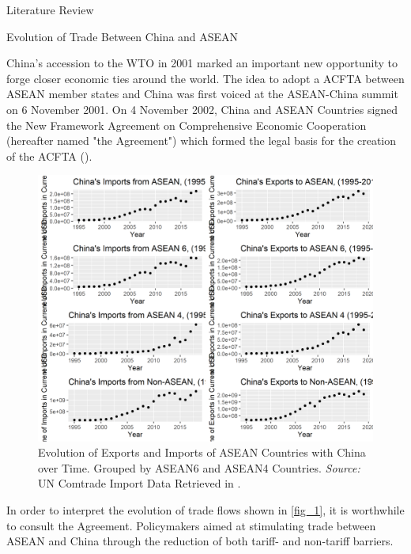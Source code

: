 \begin{section}{Literature Review}

\begin{subsection}{Evolution of Trade Between China and ASEAN}

China’s accession to the WTO in 2001 marked an important new opportunity to forge closer economic ties around the world. The idea to adopt a ACFTA between ASEAN member states and China was first voiced at the ASEAN-China summit on 6 November 2001. On 4 November 2002, China and ASEAN Countries signed the New Framework Agreement on Comprehensive Economic Cooperation (hereafter named "the Agreement") which formed the legal basis for the creation of the ACFTA (\cite{asean_2002_1}). 

\begin{figure}[H]
	\centering
	\includegraphics[width=\textwidth]{figure_1.png}
	\caption{\small{Evolution of Exports and Imports of ASEAN Countries with China over Time. Grouped by ASEAN6 and ASEAN4 Countries. \textit{Source:} UN Comtrade Import Data Retrieved in \cite{cepii-data_2022}.}}
	\label{fig_1}
\end{figure}

In order to interpret the evolution of trade flows shown in \autoref{fig_1}, it is worthwhile to consult the Agreement. Policymakers aimed at stimulating trade between ASEAN and China through the reduction of both tariff- and non-tariff barriers. 


\end{subsection}
\end{section}
